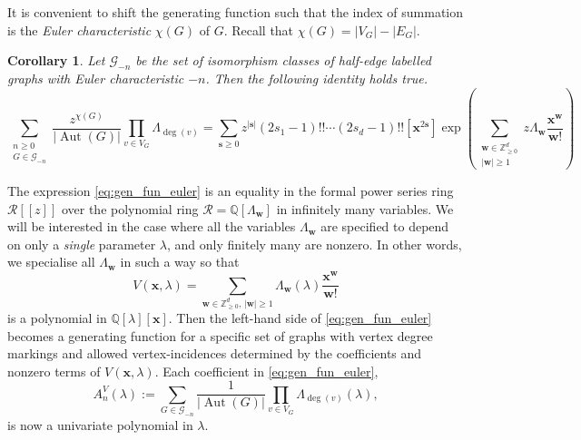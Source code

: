 \documentclass[11pt, a4paper]{article}
\numberwithin{theorem}{section}
\newtheorem{corollary}[theorem]{Corollary}
\theoremstyle{remark}
\newcommand{\GG}{\mathcal{G}}
\newcommand{\QQ}{\mathbb{Q}}
\newcommand{\ZZ}{\mathbb{Z}}
\DeclareMathOperator{\Aut}{Aut}
\newcommand{\bb}[1]{\boldsymbol{#1}}
\theoremstyle{theorem}
\begin{document}
It is convenient to shift the generating function such that the index of summation is the \emph{Euler characteristic} $\chi(G)$ of $G$. Recall that $\chi(G) = |V_G| - |E_G|$.

\begin{corollary}
    \label{cor:gen_fun}
    Let $\GG_{-n}$ be the set of isomorphism classes of half-edge labelled graphs with Euler characteristic $-n$. Then the following identity holds true.
    \begin{equation}
    \label{eq:gen_fun_euler}
    \sum_{\substack{n\geq 0\\ G \in \GG_{-n}}} \frac{z^{\chi(G)}}{|\Aut(G)|}\prod_{v\in V_G} \Lambda_{\deg(v)} =  \sum_{\bb{s} \geq 0} z^{|\bb{s}|} (2s_1-1)!!\cdots (2s_d-1)!! [\bb{x}^{2\bb{s}}]\exp\left( \sum_{\substack{\bb{w}\in \ZZ^d_{\geq 0}\\ |\bb{w}| \geq 1}} z\Lambda_{\bb{w}} \frac{\bb{x}^{\bb{w}}}{\bb{w}!} \right)
  \end{equation}  
\end{corollary}

The expression \eqref{eq:gen_fun_euler} is an equality in the formal power series ring $\mathcal{R}[[z]]$ over the polynomial ring $\mathcal{R} = \QQ[\Lambda_{\bb{w}}]$ in infinitely many variables. We will be interested in the case where all the variables $\Lambda_{\bb{w}}$ are specified to depend on only a \emph{single} parameter $\lambda$, and only finitely many are nonzero. In other words, we specialise all $\Lambda_{\bb{w}}$ in such a way so that
\[
    V(\bb{x},\lambda) = \sum_{\bb{w}\in \ZZ^d_{\geq 0},\, |\bb{w}| \geq 1} \Lambda_{\bb{w}}(\lambda) \frac{\bb{x}^{\bb{w}}}{\bb{w}!}
\]
is a polynomial in $\QQ[\lambda][\bb{x}]$. Then the left-hand side of \eqref{eq:gen_fun_euler} becomes a generating function for a specific set of graphs with vertex degree markings and allowed vertex-incidences determined by the coefficients and nonzero terms of $V(\bb{x},\lambda)$. Each coefficient in \eqref{eq:gen_fun_euler},
\[
  A^V_n(\lambda) := \sum_{G \in \GG_{-n}} \frac{1}{|\Aut(G)|}\prod_{v\in V_G} \Lambda_{\deg(v)}(\lambda),
\]
is now a univariate polynomial in $\lambda$.
\end{document}
